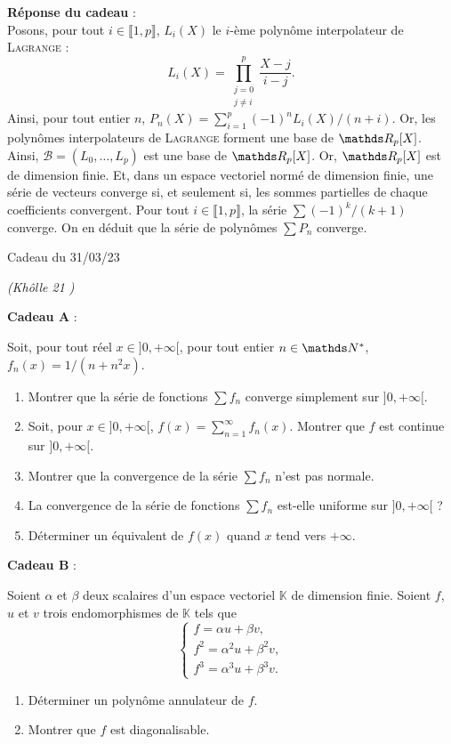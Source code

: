 \documentclass[a4paper]{article}
\begin{document}
	\bigskip\bigskip
	\textbf{Réponse du cadeau} :\\
	Posons, pour tout $i \in \llbracket 1,p \rrbracket$, $L_i(X)$ le $i$-ème polynôme interpolateur de \textsc{Lagrange} : \[
		L_i(X) = \prod_{\substack{j = 0\\ j \neq i}}^p \frac{X-j}{i-j}
	.\]
	Ainsi, pour tout entier $n$, $P_n(X) = \sum_{i=1}^p (-1)^n L_i(X) / (n +i)$.
	Or, les polynômes interpolateurs de \textsc{Lagrange} forment une base de $\R_p[X]$. Ainsi, $\mathcal{B} = (L_0, \ldots, L_p)$ est une base de $\R_p[X]$.
	Or, $\R_p[X]$ est de dimension finie.
	Et, dans un espace vectoriel normé de dimension finie, une série de vecteurs converge si, et seulement si, les sommes partielles de chaque coefficients convergent.
	Pour tout $i \in \llbracket 1,p \rrbracket$, la série $\sum (-1)^k / (k + 1)$ converge.
	On en déduit que la série de polynômes $\sum P_n$ converge.

	\clearpage
	\centerline{\LARGE Cadeau du 31/03/23}
	\centerline{\itshape (Khôlle 21 \textinterrobang)}

	\bigskip
	\bigskip
	\bigskip
	\textbf{Cadeau A} :\\
	\begin{slshape}
		Soit, pour tout réel $x \in {]0,+\infty[}$, pour tout entier $n \in \N^*$, $f_n(x) = 1 / (n + n^2 x)$.
		\begin{enumerate}
			\item Montrer que la série de fonctions $\sum f_n$ converge simplement sur $]0,+\infty[$.
			\item Soit, pour $x \in {]0,+\infty[}$, $f(x) = \sum_{n=1}^\infty f_n(x)$.
				Montrer que $f$ est continue sur $]0,+\infty[$.
			\item[2{,}5.] Montrer que la convergence de la série $\sum f_n$ n'est pas normale.
			\item La convergence de la série de fonctions $\sum f_n$ est-elle uniforme sur $]0,+\infty[$ ?
			\item Déterminer un équivalent de $f(x)$ quand $x$ tend vers $+\infty$.
		\end{enumerate}
	\end{slshape}

	\bigskip

	\centerline{}

	\textbf{Cadeau B} :\\
	\begin{slshape}
		Soient $\alpha$ et $\beta$ deux scalaires d'un espace vectoriel $\mathds{K}$ de dimension finie.
		Soient $f$, $u$ et $v$ trois endomorphismes de $\mathds{K}$ tels que
		\[
			\begin{cases}
				f = \alpha u + \beta v,\\
				f^2 = \alpha^2 u + \beta^2 v,\\
				f^3 = \alpha^3 u + \beta^3 v.
			\end{cases}
		\]
		\begin{enumerate}
			\item Déterminer un polynôme annulateur de $f$.
			\item Montrer que $f$ est diagonalisable.
		\end{enumerate}
	\end{slshape}
\end{document}
